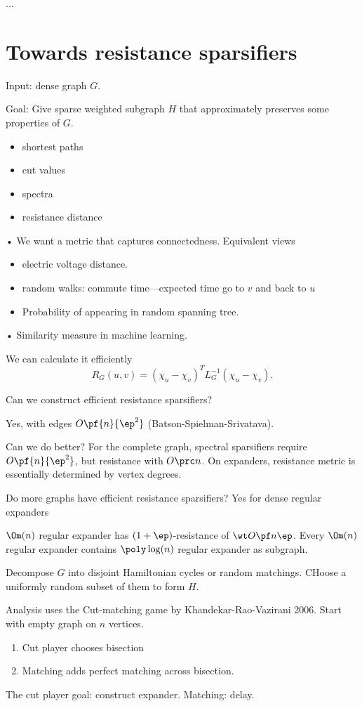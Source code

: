...

\section{Towards resistance sparsifiers}

Input: dense graph $G$. 

Goal: Give sparse weighted subgraph $H$ that approximately preserves some properties of $G$.
\begin{itemize}
\item
shortest paths
\item
cut values
\item
spectra
\item
resistance distance
\end{itemize}•
We want a metric that captures connectedness. Equivalent views
\begin{itemize}
\item
electric voltage distance.
\item random walks: commute time---expected time go to $v$ and back to $u$
\item Probability of appearing in random spanning tree.
\end{itemize}•
Similarity measure in machine learning.

We can calculate it efficiently
\[
R_G(u,v)=(\chi_u-\chi_v)^TL_G^{-1}(\chi_u-\chi_v).
\]

Can we construct efficient resistance sparsifiers?

Yes, with edges $O\pf{n}{\ep^2}$ (Batson-Spielman-Srivatava).

Can we do better? For the complete graph, spectral sparsifiers require $O\pf{n}{\ep^2}$, but resistance with $O\prc n$. On expanders, resistance metric is essentially determined by vertex degrees.

Do more graphs have efficient resistance sparsifiers?
Yes for dense regular expanders
\begin{thm}
$\Om(n)$ regular expander has $(1+\ep)$-resistance of $\wt O\pf n\ep$.
Every $\Om(n)$ regular expander contains $\poly\log(n)$ regular expander as subgraph.
\end{thm}
Decompose $G$ into disjoint Hamiltonian cycles or random matchings. CHoose a uniformly random subset of them to form $H$.

Analysis uses the Cut-matching game by Khandekar-Rao-Vazirani 2006.
Start with empty graph on $n$ vertices.
\begin{enumerate}
\item
Cut player chooses bisection
\item
Matching adds perfect matching across bisection.
\end{enumerate}
The cut player goal: construct expander.
Matching: delay.

